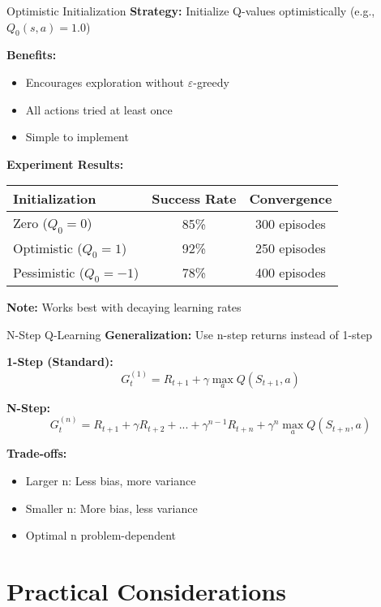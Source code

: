 \documentclass[aspectratio=169,10pt]{beamer}
\begin{document}
\begin{frame}{Optimistic Initialization}
\textbf{Strategy:} Initialize Q-values optimistically (e.g., $Q_0(s,a) = 1.0$)

\textbf{Benefits:}
\begin{itemize}
    \item Encourages exploration without $\varepsilon$-greedy
    \item All actions tried at least once
    \item Simple to implement
\end{itemize}

\textbf{Experiment Results:}
\begin{center}
\begin{tabular}{|l|c|c|}
\hline
\textbf{Initialization} & \textbf{Success Rate} & \textbf{Convergence} \\
\hline
Zero ($Q_0 = 0$) & 85\% & 300 episodes \\
Optimistic ($Q_0 = 1$) & 92\% & 250 episodes \\
Pessimistic ($Q_0 = -1$) & 78\% & 400 episodes \\
\hline
\end{tabular}
\end{center}

\textbf{Note:} Works best with decaying learning rates
\end{frame}

\begin{frame}{N-Step Q-Learning}
\textbf{Generalization:} Use n-step returns instead of 1-step

\textbf{1-Step (Standard):}
$$G_t^{(1)} = R_{t+1} + \gamma \max_a Q(S_{t+1}, a)$$

\textbf{N-Step:}
$$G_t^{(n)} = R_{t+1} + \gamma R_{t+2} + ... + \gamma^{n-1} R_{t+n} + \gamma^n \max_a Q(S_{t+n}, a)$$

\textbf{Trade-offs:}
\begin{itemize}
    \item Larger n: Less bias, more variance
    \item Smaller n: More bias, less variance
    \item Optimal n problem-dependent
\end{itemize}
\end{frame}

\section{Practical Considerations}
\end{document}
